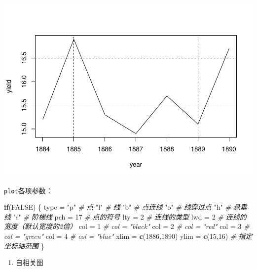 \documentclass[]{article}
\newenvironment{Shaded}{\begin{snugshade}}{\end{snugshade}}
\newcommand{\CommentTok}[1]{\textcolor[rgb]{0.56,0.35,0.01}{\textit{#1}}}
\newcommand{\ControlFlowTok}[1]{\textcolor[rgb]{0.13,0.29,0.53}{\textbf{#1}}}
\newcommand{\DecValTok}[1]{\textcolor[rgb]{0.00,0.00,0.81}{#1}}
\newcommand{\KeywordTok}[1]{\textcolor[rgb]{0.13,0.29,0.53}{\textbf{#1}}}
\newcommand{\NormalTok}[1]{#1}
\newcommand{\OtherTok}[1]{\textcolor[rgb]{0.56,0.35,0.01}{#1}}
\newcommand{\StringTok}[1]{\textcolor[rgb]{0.31,0.60,0.02}{#1}}
\providecommand{\tightlist}{%
  \setlength{\itemsep}{0pt}\setlength{\parskip}{0pt}}
\begin{document}
\includegraphics{timeseries_files/figure-latex/unnamed-chunk-7-1.pdf}

\texttt{plot}各项参数：

\begin{Shaded}
\begin{Highlighting}[]
\ControlFlowTok{if}\NormalTok{(}\OtherTok{FALSE}\NormalTok{) \{}
\NormalTok{  type =}\StringTok{ "p"}  \CommentTok{# 点}
         \StringTok{"l"}  \CommentTok{# 线}
         \StringTok{"b"}  \CommentTok{# 点连线}
         \StringTok{"o"}  \CommentTok{# 线穿过点}
         \StringTok{"h"}  \CommentTok{# 悬垂线}
         \StringTok{"s"}  \CommentTok{# 阶梯线}
\NormalTok{  pch =}\StringTok{ }\DecValTok{17} \CommentTok{# 点的符号}
\NormalTok{  lty =}\StringTok{ }\DecValTok{2}  \CommentTok{# 连线的类型}
\NormalTok{  lwd =}\StringTok{ }\DecValTok{2}  \CommentTok{# 连线的宽度（默认宽度的2倍）}
\NormalTok{  col =}\StringTok{ }\DecValTok{1}  \CommentTok{# col = "black"}
\NormalTok{  col =}\StringTok{ }\DecValTok{2}  \CommentTok{# col = "red"}
\NormalTok{  col =}\StringTok{ }\DecValTok{3}  \CommentTok{# col = "green"}
\NormalTok{  col =}\StringTok{ }\DecValTok{4}  \CommentTok{# col = "blue"}
\NormalTok{  xlim =}\StringTok{ }\KeywordTok{c}\NormalTok{(}\DecValTok{1886}\NormalTok{,}\DecValTok{1890}\NormalTok{)}
\NormalTok{  ylim =}\StringTok{ }\KeywordTok{c}\NormalTok{(}\DecValTok{15}\NormalTok{,}\DecValTok{16}\NormalTok{) }\CommentTok{# 指定坐标轴范围}
\NormalTok{\}}
\end{Highlighting}
\end{Shaded}

\begin{enumerate}
\def\labelenumi{\arabic{enumi}.}
\setcounter{enumi}{1}
\tightlist
\item
  自相关图
\end{enumerate}
\end{document}

